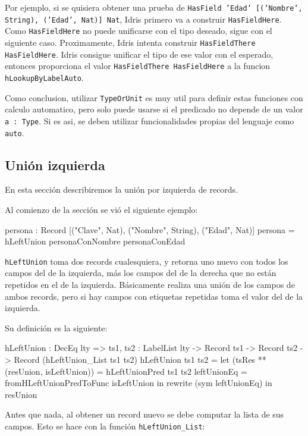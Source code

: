 Por ejemplo, si se quisiera obtener una prueba de \texttt{HasField 'Edad' [('Nombre', String), ('Edad', Nat)] Nat}, Idris primero va a construir \texttt{HasFieldHere}. Como \texttt{HasFieldHere} no puede unificarse con el tipo deseado, sigue con el siguiente caso. Proximamente, Idris intenta construir \texttt{HasFieldThere HasFieldHere}. Idris consigue unificar el tipo de ese valor con el esperado, entonces proporciona el valor \texttt{HasFieldThere HasFieldHere} a la funcion \texttt{hLookupByLabelAuto}.

Como conclusion, utilizar \texttt{TypeOrUnit} es muy util para definir estas funciones con calculo automatico, pero solo puede usarse si el predicado no depende de un valor \texttt{a : Type}. Si es asi, se deben utilizar funcionalidades propias del lenguaje como \texttt{auto}.

\subsection{Unión izquierda}

En esta sección describiremos la unión por izquierda de records. 

Al comienzo de la sección se vió el siguiente ejemplo:

\begin{code}
persona : Record [("Clave", Nat), ("Nombre", String), 
  ("Edad", Nat)]
persona = hLeftUnion personaConNombre personaConEdad
\end{code}

\texttt{hLeftUnion} toma dos records cualesquiera, y retorna uno nuevo con todos los campos del de la izquierda, más los campos del de la derecha que no están repetidos en el de la izquierda. Básicamente realiza una unión de los campos de ambos records, pero si hay campos con etiquetas repetidas toma el valor del de la izquierda.

Su definición es la siguiente:

\begin{code}
hLeftUnion : DecEq lty => {ts1, ts2 : LabelList lty} -> 
  Record ts1 -> Record ts2 -> Record (hLeftUnion_List ts1 ts2)
hLeftUnion ts1 ts2 =
  let (tsRes ** (resUnion, isLeftUnion)) = 
        hLeftUnionPred ts1 ts2
      leftUnionEq = fromHLeftUnionPredToFunc isLeftUnion
  in rewrite (sym leftUnionEq) in resUnion 
\end{code}

Antes que nada, al obtener un record nuevo se debe computar la lista de sus campos. Esto se hace con la función \texttt{hLeftUnion\_List}:

